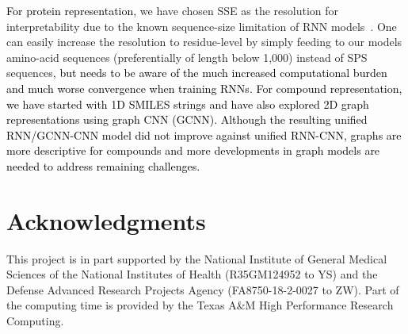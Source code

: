 \documentclass[nocrop]{bioinfo}
\newcommand{\red}[1]{\textcolor{black}{#1}}
\begin{document}
\red{For protein representation,} we have chosen SSE as the resolution for interpretability due to the known sequence-size limitation of RNN models~\citep{IndRNN}. One can easily increase the resolution to residue-level by simply feeding to our models amino-acid sequences  (preferentially of length below 1,000) instead of SPS sequences, \red{but needs to be aware of the much increased computational burden and much worse convergence when training RNNs.} \red{For compound representation, we have started with 1D SMILES strings and have also explored 2D graph representations using graph CNN (GCNN).  Although the resulting unified RNN/GCNN-CNN model did not improve against unified RNN-CNN, graphs are more descriptive for compounds and more developments in graph models are needed to address remaining challenges. }


\section*{Acknowledgments}
This project is in part supported by the National Institute of General Medical Sciences of the National Institutes of Health  (R35GM124952 to YS) and the Defense Advanced Research Projects Agency  (FA8750-18-2-0027 to ZW). Part of the computing time is provided by the Texas A\&M High Performance Research Computing.   

\vspace{-2em}





\end{document}
